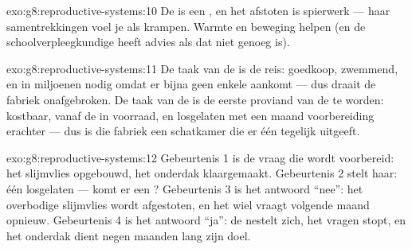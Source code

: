 \begin{solution}{exo:g8:reproductive-systems:10}
De  is een , en het afstoten is spierwerk --- haar
samentrekkingen voel je als krampen. Warmte en beweging helpen (en de
schoolverpleegkundige heeft advies als dat niet genoeg is).
\end{solution}

\begin{solution}{exo:g8:reproductive-systems:11}
De taak van de  is de reis: goedkoop, zwemmend, en in miljoenen
nodig omdat er bijna geen enkele aankomt --- dus draait de fabriek
onafgebroken. De taak van de  is de eerste proviand van de  te
worden: kostbaar, vanaf de  in voorraad, en losgelaten met een
maand voorbereiding erachter --- dus is die fabriek een schatkamer die er
één tegelijk uitgeeft.
\end{solution}

\begin{solution}{exo:g8:reproductive-systems:12}
Gebeurtenis 1 is de vraag die wordt voorbereid: het slijmvlies opgebouwd,
het onderdak klaargemaakt. Gebeurtenis 2 stelt haar: één  losgelaten
--- komt er een ? Gebeurtenis 3 is het antwoord ``nee'': het
overbodige slijmvlies wordt afgestoten, en het wiel vraagt volgende maand
opnieuw. Gebeurtenis 4 is het antwoord ``ja'': de  nestelt zich, het
vragen stopt, en het onderdak dient negen maanden lang zijn doel.
\end{solution}

